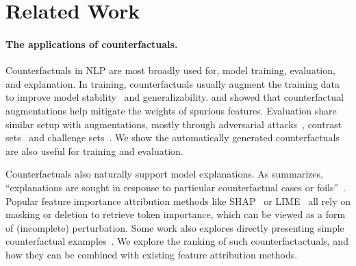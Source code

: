 \section{Related Work}
\label{sec:relate}

\paragraph{The applications of counterfactuals.}

Counterfactuals in NLP are most broadly used for, model training, evaluation, and explanation.
In training, counterfactuals usually augment the training data to improve model stability~\cite{Wu2019ConditionalBC, Wei2019EDAED, Kumar2020DataAU} and generalizability.
\citet{kaushik2019learning} and \citet{teney2020learning} showed that counterfactual augmentations help mitigate the weights of spurious features.
Evaluation share similar setup with augmentations, mostly through adversarial attacks~\cite{Song2020UniversalAA}, contrast sets~\cite{kaushik2019learning} and challenge sets~\cite{Geiger2019PosingFG, liu-etal-2019-inoculation}.
We show the automatically generated counterfactuals are also useful for training and evaluation.

Counterfactuals also naturally support model explanations.
As \citet{miller} summarizes, ``explanations are sought in response to particular counterfactual cases or foils''~\cite{miller}.
Popular feature importance attribution methods like SHAP~\cite{NIPS2017_7062} or LIME~\cite{Ribeiro2016WhySI} all rely on masking or deletion to retrieve token importance, which can be viewed as a form of (incomplete) perturbation.
Some work also explores directly presenting simple counterfactual examples~\cite{hase2020evaluating, vig2020causal, kang2020counterfactual}.
We explore the ranking of such counterfactactuals, and how they can be combined with existing feature attribution methods.

